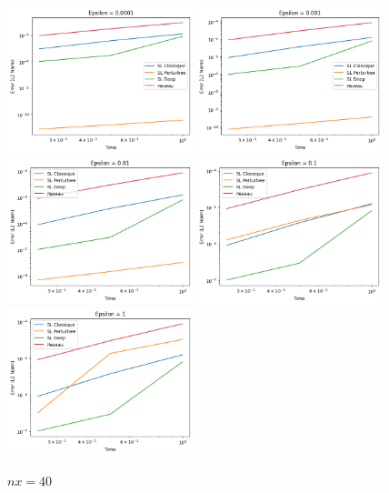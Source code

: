 \documentclass{article}
\begin{document}
\begin{figure}[!h]
    \centering
    \includegraphics[width=0.48\textwidth]{images/ep21.png}
    \includegraphics[width=0.48\textwidth]{images/ep22.png}
    \includegraphics[width=0.48\textwidth]{images/ep23.png}
    \includegraphics[width=0.48\textwidth]{images/ep24.png}
    \includegraphics[width=0.48\textwidth]{images/ep25.png}
    \caption{$nx = 40$}
\end{figure}
\end{document}
